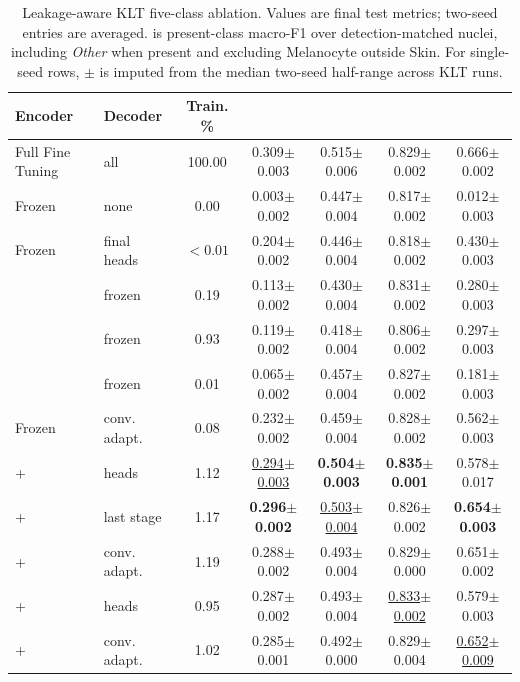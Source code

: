 \begin{table}
\caption{Leakage-aware KLT five-class ablation. Values are final test metrics; two-seed entries are averaged. \Ftype{} is present-class macro-F1 over detection-matched nuclei, including \textit{Other} when present and excluding Melanocyte outside Skin. For single-seed rows, $\pm$ is imputed from the median two-seed half-range across KLT runs.}
\label{tab:klt}
\centering
\footnotesize
\setlength{\tabcolsep}{3pt}
\begin{tabular}{llccccc}
\toprule
Encoder & Decoder & Train. \% & \mPQ{} & \bPQ{} & \Fdet{} & \Ftype{} \\
\midrule
Full Fine Tuning & all & 100.00 & 0.309{\scriptsize$\pm$0.003} & 0.515{\scriptsize$\pm$0.006} & 0.829{\scriptsize$\pm$0.002} & 0.666{\scriptsize$\pm$0.002} \\
\midrule
Frozen & none & 0.00 & 0.003{\scriptsize$\pm$0.002} & 0.447{\scriptsize$\pm$0.004} & 0.817{\scriptsize$\pm$0.002} & 0.012{\scriptsize$\pm$0.003} \\
Frozen & final heads & $<0.01$ & 0.204{\scriptsize$\pm$0.002} & 0.446{\scriptsize$\pm$0.004} & 0.818{\scriptsize$\pm$0.002} & 0.430{\scriptsize$\pm$0.003} \\
\LoRA{} & frozen & 0.19 & 0.113{\scriptsize$\pm$0.002} & 0.430{\scriptsize$\pm$0.004} & 0.831{\scriptsize$\pm$0.002} & 0.280{\scriptsize$\pm$0.003} \\
\AF{} & frozen & 0.93 & 0.119{\scriptsize$\pm$0.002} & 0.418{\scriptsize$\pm$0.004} & 0.806{\scriptsize$\pm$0.002} & 0.297{\scriptsize$\pm$0.003} \\
\VeRA{} & frozen & 0.01 & 0.065{\scriptsize$\pm$0.002} & 0.457{\scriptsize$\pm$0.004} & 0.827{\scriptsize$\pm$0.002} & 0.181{\scriptsize$\pm$0.003} \\
Frozen & conv. adapt. & 0.08 & 0.232{\scriptsize$\pm$0.002} & 0.459{\scriptsize$\pm$0.004} & 0.828{\scriptsize$\pm$0.002} & 0.562{\scriptsize$\pm$0.003} \\
\LoRA{}+\AF{} & heads & 1.12 & \underline{0.294{\scriptsize$\pm$0.003}} & \textbf{0.504{\scriptsize$\pm$0.003}} & \textbf{0.835{\scriptsize$\pm$0.001}} & 0.578{\scriptsize$\pm$0.017} \\
\LoRA{}+\AF{} & last stage & 1.17 & \textbf{0.296{\scriptsize$\pm$0.002}} & \underline{0.503{\scriptsize$\pm$0.004}} & 0.826{\scriptsize$\pm$0.002} & \textbf{0.654{\scriptsize$\pm$0.003}} \\
\LoRA{}+\AF{} & conv. adapt. & 1.19 & 0.288{\scriptsize$\pm$0.002} & 0.493{\scriptsize$\pm$0.004} & 0.829{\scriptsize$\pm$0.000} & 0.651{\scriptsize$\pm$0.002} \\
\VeRA{}+\AF{} & heads & 0.95 & 0.287{\scriptsize$\pm$0.002} & 0.493{\scriptsize$\pm$0.004} & \underline{0.833{\scriptsize$\pm$0.002}} & 0.579{\scriptsize$\pm$0.003} \\
\VeRA{}+\AF{} & conv. adapt. & 1.02 & 0.285{\scriptsize$\pm$0.001} & 0.492{\scriptsize$\pm$0.000} & 0.829{\scriptsize$\pm$0.004} & \underline{0.652{\scriptsize$\pm$0.009}} \\
\bottomrule
\end{tabular}
\end{table}
